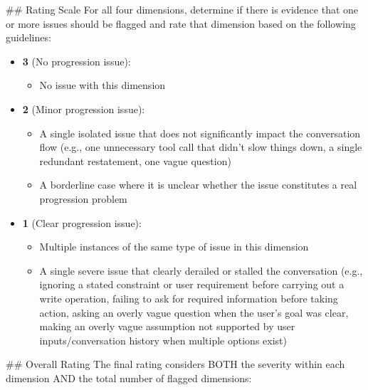 \begin{tcolorbox}[promptbox, title={\small Conversation Progression Prompt}]
      \#\# Rating Scale\newline
      For all four dimensions, determine if there is evidence that one or more issues should be flagged and rate that dimension based on the following guidelines:

      \begin{itemize}
        \item \textbf{3} (No progression issue):
        \begin{itemize}
          \item No issue with this dimension
        \end{itemize}
        \item \textbf{2} (Minor progression issue):
        \begin{itemize}
          \item A single isolated issue that does not significantly impact the conversation flow (e.g., one unnecessary tool call that didn't slow things down, a single redundant restatement, one vague question)
          \item A borderline case where it is unclear whether the issue constitutes a real progression problem
        \end{itemize}
        \item \textbf{1} (Clear progression issue):
        \begin{itemize}
          \item Multiple instances of the same type of issue in this dimension
          \item A single severe issue that clearly derailed or stalled the conversation (e.g., ignoring a stated constraint or user requirement before carrying out a write operation, failing to ask for required information before taking action, asking an overly vague question when the user's goal was clear, making an overly vague assumption not supported by user inputs/conversation history when multiple options exist)
        \end{itemize}
      \end{itemize}

      \#\# Overall Rating\newline
      The final rating considers BOTH the severity within each dimension AND the total number of flagged dimensions:


\end{tcolorbox}
